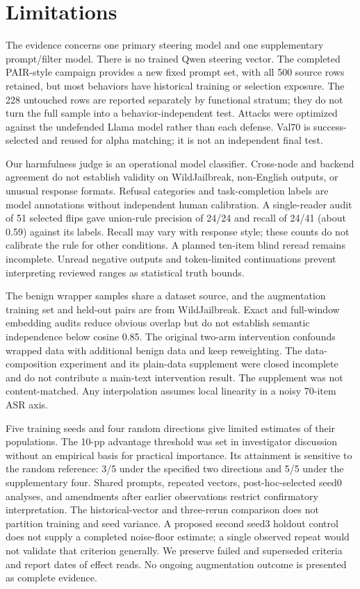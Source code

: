 \section{Limitations}
The evidence concerns one primary steering model and one supplementary prompt/filter model. There is no trained Qwen steering vector. The completed PAIR-style campaign provides a new fixed prompt set, with all 500 source rows retained, but most behaviors have historical training or selection exposure. The 228 untouched rows are reported separately by functional stratum; they do not turn the full sample into a behavior-independent test. Attacks were optimized against the undefended Llama model rather than each defense. Val70 is success-selected and reused for alpha matching; it is not an independent final test.

Our harmfulness judge is an operational model classifier. Cross-node and backend agreement do not establish validity on WildJailbreak, non-English outputs, or unusual response formats. Refusal categories and task-completion labels are model annotations without independent human calibration. A single-reader audit of 51 selected flips gave union-rule precision of 24/24 and recall of 24/41 (about 0.59) against its labels. Recall may vary with response style; these counts do not calibrate the rule for other conditions. A planned ten-item blind reread remains incomplete. Unread negative outputs and token-limited continuations prevent interpreting reviewed ranges as statistical truth bounds.

The benign wrapper samples share a dataset source, and the augmentation training set and held-out pairs are from WildJailbreak. Exact and full-window embedding audits reduce obvious overlap but do not establish semantic independence below cosine 0.85. The original two-arm intervention confounds wrapped data with additional benign data and keep reweighting. The data-composition experiment and its plain-data supplement were closed incomplete and do not contribute a main-text intervention result. The supplement was not content-matched. Any interpolation assumes local linearity in a noisy 70-item ASR axis.

Five training seeds and four random directions give limited estimates of their populations. The 10-pp advantage threshold was set in investigator discussion without an empirical basis for practical importance. Its attainment is sensitive to the random reference: 3/5 under the specified two directions and 5/5 under the supplementary four. Shared prompts, repeated vectors, post-hoc-selected seed0 analyses, and amendments after earlier observations restrict confirmatory interpretation. The historical-vector and three-rerun comparison does not partition training and seed variance. A proposed second seed3 holdout control does not supply a completed noise-floor estimate; a single observed repeat would not validate that criterion generally. We preserve failed and superseded criteria and report dates of effect reads. No ongoing augmentation outcome is presented as complete evidence.

